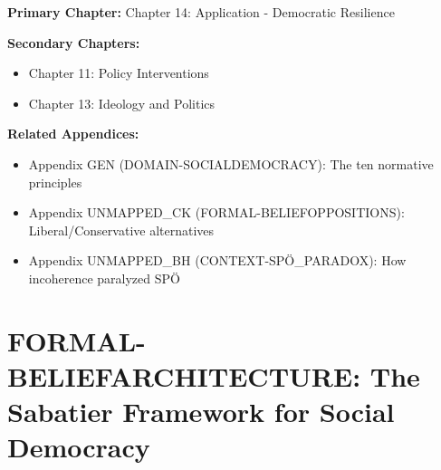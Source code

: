 %
%

\begin{tcolorbox}[colback=purple!5!white, colframe=purple!75!black,
    title=Chapter Linkage]

\textbf{Primary Chapter:} Chapter 14: Application - Democratic Resilience

\textbf{Secondary Chapters:}
\begin{itemize}[nosep]
\item Chapter 11: Policy Interventions
\item Chapter 13: Ideology and Politics
\end{itemize}

\textbf{Related Appendices:}
\begin{itemize}[nosep]
\item Appendix GEN (DOMAIN-SOCIALDEMOCRACY): The ten normative principles
\item Appendix UNMAPPED_CK (FORMAL-BELIEFOPPOSITIONS): Liberal/Conservative alternatives
\item Appendix UNMAPPED_BH (CONTEXT-SPÖ_PARADOX): How incoherence paralyzed SPÖ
\end{itemize}

\end{tcolorbox}


\chapter{FORMAL-BELIEFARCHITECTURE: The Sabatier Framework for Social Democracy}
\label{app:cj-beliefarchitecture}


